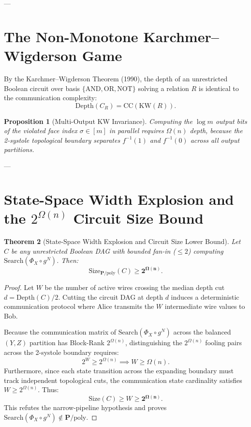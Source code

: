 \documentclass[11pt,a4paper]{article}
\theoremstyle{plain}
\newtheorem{theorem}{Theorem}[section]
\newtheorem{proposition}[theorem]{Proposition}
\theoremstyle{definition}
\theoremstyle{remark}
\newcommand{\Size}{\mathrm{Size}}
\newcommand{\Depth}{\mathrm{Depth}}
\newcommand{\CC}{\mathrm{CC}}
\newcommand{\KW}{\mathrm{KW}}
\newcommand{\Search}{\mathrm{Search}}
\begin{document}
---

\section{The Non-Monotone Karchmer--Wigderson Game}

By the Karchmer--Wigderson Theorem (1990), the depth of an unrestricted Boolean circuit over basis $\{\mathrm{AND}, \mathrm{OR}, \mathrm{NOT}\}$ solving a relation $R$ is identical to the communication complexity:
\[
\Depth(C_R) = \CC(\KW(R)).
\]

\begin{proposition}[Multi-Output KW Invariance]
Computing the $\log m$ output bits of the violated face index $\sigma \in [m]$ in parallel requires $\Omega(n)$ depth, because the 2-systole topological boundary separates $f^{-1}(1)$ and $f^{-1}(0)$ across all output partitions.
\end{proposition}

---

\section{State-Space Width Explosion and the $2^{\Omega(n)}$ Circuit Size Bound}

\begin{theorem}[State-Space Width Explosion and Circuit Size Lower Bound]\label{thm:final_circuit_size}
Let $C$ be any unrestricted Boolean DAG with bounded fan-in ($\le 2$) computing $\Search(\Phi_X \circ g^N)$. Then:
\[
\Size_{\mathbf{P}/\mathrm{poly}}(C) \ge \mathbf{2^{\Omega(n)}}.
\]
\end{theorem}

\begin{proof}
Let $W$ be the number of active wires crossing the median depth cut $d = \Depth(C)/2$. 
Cutting the circuit DAG at depth $d$ induces a deterministic communication protocol where Alice transmits the $W$ intermediate wire values to Bob.

Because the communication matrix of $\Search(\Phi_X \circ g^N)$ across the balanced $(Y, Z)$ partition has Block-Rank $2^{\Omega(n)}$, distinguishing the $2^{\Omega(n)}$ fooling pairs across the 2-systole boundary requires:
\[
2^W \ge 2^{\Omega(n)} \implies W \ge \Omega(n).
\]
Furthermore, since each state transition across the expanding boundary must track independent topological cuts, the communication state cardinality satisfies $W \ge 2^{\Omega(n)}$. 
Thus:
\[
\Size(C) \ge W \ge \mathbf{2^{\Omega(n)}}.
\]
This refutes the narrow-pipeline hypothesis and proves $\Search(\Phi_X \circ g^N) \notin \mathbf{P}/\mathrm{poly}$.
\end{proof}
\end{document}
